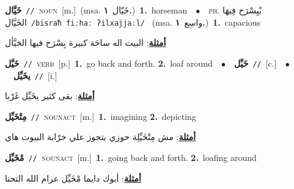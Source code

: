 \documentclass[10pt,a4paper,twoside]{article} %
\begin{document}
\begin{multicols}{2}
{\setlength\topsep{0pt}\textbf{\foreignlanguage{arabic}{خَيَّال}}\ {\color{gray}\texttt{//}\color{black}}\ \textsc{noun}\ [m.]\ \color{gray}(msa. \foreignlanguage{arabic}{خَيّال}~\foreignlanguage{arabic}{\textbf{١.}})\color{black}\ \textbf{1.}~horseman\ \ $\bullet$\ \ \textsc{ph.} \color{gray} \foreignlanguage{arabic}{بْيِسْرَح فِيهَا الخَيَّال}\color{black}\ {\color{gray}\texttt{/{\sffamily bisraħ fiːhaː ʔilxajjaːl}/}\color{black}}\ \color{gray} (msa. \foreignlanguage{arabic}{واسِع}~\foreignlanguage{arabic}{\textbf{١.}})\color{black}\ \textbf{1.}~capacious\  \begin{flushright}\color{gray}\foreignlanguage{arabic}{\textbf{\underline{\foreignlanguage{arabic}{أمثلة}}}: البيت اله ساحَة كبيرة بِسْرَح فيها الخيَّأل}\end{flushright}\color{black}} \vspace{2mm}

{\setlength\topsep{0pt}\textbf{\foreignlanguage{arabic}{خَيَّل}}\ {\color{gray}\texttt{//}\color{black}}\ \textsc{verb}\ [p.]\ \textbf{1.}~go back and forth.  \textbf{2.}~loaf around\ \ $\bullet$\ \ \setlength\topsep{0pt}\textbf{\foreignlanguage{arabic}{خَيِّل}}\ {\color{gray}\texttt{//}\color{black}}\ [c.]\ \ $\bullet$\ \ \setlength\topsep{0pt}\textbf{\foreignlanguage{arabic}{يخَيِّل}}\ {\color{gray}\texttt{//}\color{black}}\ [i.]\  \begin{flushright}\color{gray}\foreignlanguage{arabic}{\textbf{\underline{\foreignlanguage{arabic}{أمثلة}}}: بقى كثير يخَيِّل غَرْبا}\end{flushright}\color{black}} \vspace{2mm}

{\setlength\topsep{0pt}\textbf{\foreignlanguage{arabic}{مِتْخَيِّل}}\ {\color{gray}\texttt{//}\color{black}}\ \textsc{noun\textunderscore act}\ [m.]\ \textbf{1.}~imagining  \textbf{2.}~depicting\  \begin{flushright}\color{gray}\foreignlanguage{arabic}{\textbf{\underline{\foreignlanguage{arabic}{أمثلة}}}: مش مِتْخَيِّلِة حوزي يتجوز علي خرّابة البيوت هاي}\end{flushright}\color{black}} \vspace{2mm}

{\setlength\topsep{0pt}\textbf{\foreignlanguage{arabic}{مْخَيِّل}}\ {\color{gray}\texttt{//}\color{black}}\ \textsc{noun\textunderscore act}\ [m.]\ \textbf{1.}~going back and forth.  \textbf{2.}~loafing around\  \begin{flushright}\color{gray}\foreignlanguage{arabic}{\textbf{\underline{\foreignlanguage{arabic}{أمثلة}}}: أبوك دايما مْخَيِّل عرام الله التحتا}\end{flushright}\color{black}} \vspace{2mm}


\end{multicols}
\end{document}
